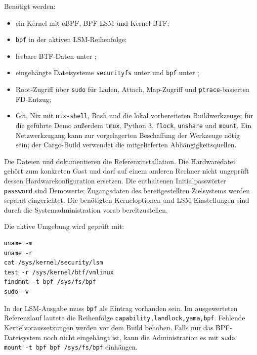 \documentclass[12pt,a4paper]{article}
\begin{document}
Benötigt werden:
\begin{itemize}[nosep]
  \item ein Kernel mit eBPF, BPF-LSM und Kernel-BTF;
  \item \texttt{bpf} in der aktiven LSM-Reihenfolge;
  \item lesbare BTF-Daten unter ;
  \item eingehängte Dateisysteme \texttt{securityfs} unter
     und \texttt{bpf} unter ;
  \item Root-Zugriff über \texttt{sudo} für Laden, Attach, Map-Zugriff und
    \texttt{ptrace}-basierten FD-Entzug;
  \item Git, Nix mit \texttt{nix-shell}, Bash und die lokal vorbereiteten
    Buildwerkzeuge; für die geführte Demo außerdem \texttt{tmux}, Python 3,
    \texttt{flock}, \texttt{unshare} und \texttt{mount}.
    Ein Netzwerkzugang kann zur vorgelagerten Beschaffung der Werkzeuge nötig sein;
    der Cargo-Build verwendet die mitgelieferten Abhängigkeitsquellen.
\end{itemize}

Die Dateien  und
 dokumentieren die Referenzinstallation.
Die Hardwaredatei gehört zum konkreten Gast und darf auf einem anderen Rechner
nicht ungeprüft dessen Hardwarekonfiguration ersetzen. Die enthaltenen
Initialpasswörter \texttt{password} sind Demowerte; Zugangsdaten des bereitgestellten
Zielsystems werden separat eingerichtet. Die benötigten Kerneloptionen und
LSM-Einstellungen sind durch die Systemadministration vorab bereitzustellen.

Die aktive Umgebung wird geprüft mit:
\begin{lstlisting}
uname -m
uname -r
cat /sys/kernel/security/lsm
test -r /sys/kernel/btf/vmlinux
findmnt -t bpf /sys/fs/bpf
sudo -v
\end{lstlisting}
In der LSM-Ausgabe muss \texttt{bpf} als Eintrag vorhanden sein. Im ausgewerteten
Referenzlauf lautete die Reihenfolge \texttt{capability,landlock,yama,bpf}.
Fehlende Kernelvoraussetzungen werden vor dem Build behoben. Falls nur das
BPF-Dateisystem noch nicht eingehängt ist, kann die Administration es mit
\texttt{sudo mount -t bpf bpf /sys/fs/bpf} einhängen.
\end{document}
